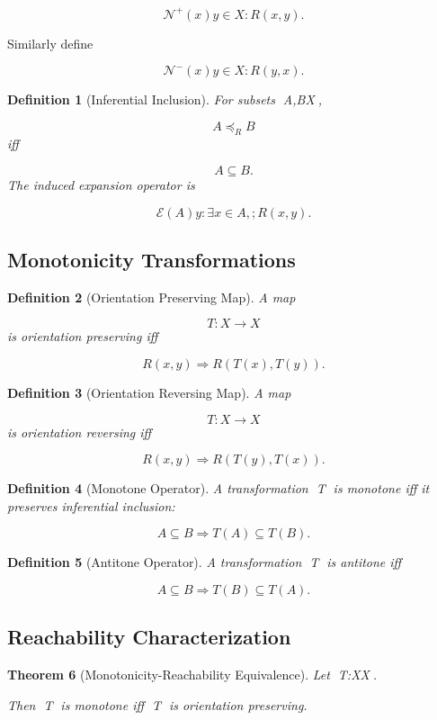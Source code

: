 \documentclass[12pt]{article}
\newtheorem{theorem}{Theorem}[section]
\newtheorem{definition}[theorem]{Definition}
\theoremstyle{remark}
\begin{document}
\[
\mathcal{N}^{+}(x)
{y\in X:R(x,y)}.
\]

Similarly define

\[
\mathcal{N}^{-}(x)
{y\in X:R(y,x)}.
\]

\begin{definition}[Inferential Inclusion]
For subsets A,B\subseteq X,

\[
A\preceq_R B
\]
iff

\[
A\subseteq B.
\]
The induced expansion operator is

\[
\mathcal{E}(A)
{y:\exists x\in A,;R(x,y)}.
\]
\end{definition}

\subsection{Monotonicity Transformations}

\begin{definition}[Orientation Preserving Map]
A map

\[
T:X\rightarrow X
\]
is orientation preserving iff

\[
R(x,y)
\Longrightarrow
R(T(x),T(y)).
\]
\end{definition}
\begin{definition}[Orientation Reversing Map]
A map

\[
T:X\rightarrow X
\]
is orientation reversing iff

\[
R(x,y)
\Longrightarrow
R(T(y),T(x)).
\]
\end{definition}
\begin{definition}[Monotone Operator]
A transformation T is monotone iff it preserves inferential inclusion:

\[
A\subseteq B
\Longrightarrow
T(A)\subseteq T(B).
\]
\end{definition}
\begin{definition}[Antitone Operator]
A transformation T is antitone iff

\[
A\subseteq B
\Longrightarrow
T(B)\subseteq T(A).
\]
\end{definition}
\subsection{Reachability Characterization}

\begin{theorem}[Monotonicity-Reachability Equivalence]
Let T:X\to X.

Then T is monotone iff T is orientation preserving.
\end{theorem}
\end{document}
